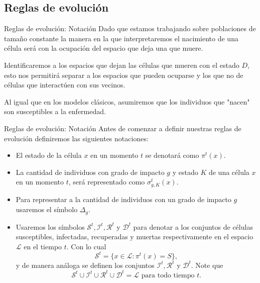 \documentclass[9pt]{beamer}
\begin{document}
\subsection{Reglas de evolución}

\begin{frame}{Reglas de evolución: Notación}
Dado que estamos trabajando sobre poblaciones de tamaño constante la manera en la que interpretaremos el nacimiento de una célula será con la ocupación del espacio que deja una que muere. 

Identificaremos a los espacios que dejan las células que mueren con el estado $D$, esto nos permitirá separar a los espacios que pueden ocuparse y los que no de células que interactúen con sus vecinos. 

Al igual que en los modelos clásicos, asumiremos que los individuos que "nacen" son susceptibles a la enfermedad.
\end{frame}

\begin{frame}{Reglas de evolución: Notación}
Antes de comenzar a definir nuestras reglas de evolución definiremos las siguientes notaciones:
\begin{itemize}
    \item El estado de la célula $x$ en un momento $t$ se denotará como $\pi^t(x)$.
    \item La cantidad de individuos con grado de impacto $g$ y estado $K$ de una célula $x$ en un momento $t$, será representado como $\sigma_{g,K}^t(x)$.
    \item Para representar a la cantidad de individuos con un grado de impacto $g$ usaremos el símbolo $\Delta_g$. 
    \item Usaremos los símbolos $\mathcal{S}^t,\mathcal{I}^t,\mathcal{R}^t$ y $\mathcal{D}^t$ para denotar a los conjuntos de células susceptibles, infectadas, recuperadas y muertas respectivamente en el espacio $\mathcal{L}$ en el tiempo $t$. Con lo cual
    $$\mathcal{S}^t=\{x\in\mathcal{L}:\pi^t(x)=S\},$$
    y de manera análoga se definen los conjuntos $\mathcal{I}^t,\mathcal{R}^t$ y $\mathcal{D}^t$. Note que $$\mathcal{S}^t\cup\mathcal{I}^t\cup\mathcal{R}^t\cup\mathcal{D}^t=\mathcal{L}\text{ para todo tiempo }t.$$
\end{itemize}
\end{frame}
\end{document}
